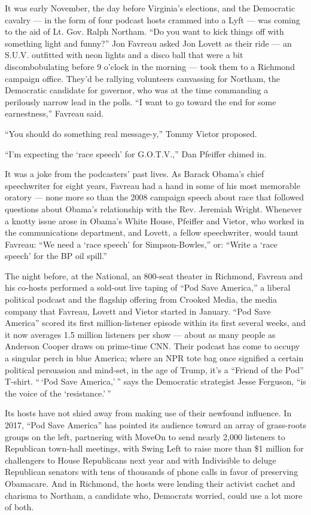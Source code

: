 It was early November, the day before Virginia's elections, and the
Democratic cavalry --- in the form of four podcast hosts crammed into a
Lyft --- was coming to the aid of Lt. Gov. Ralph Northam. ``Do you want
to kick things off with something light and funny?'' Jon Favreau asked
Jon Lovett as their ride --- an S.U.V. outfitted with neon lights and a
disco ball that were a bit discombobulating before 9 o'clock in the
morning --- took them to a Richmond campaign office. They'd be rallying
volunteers canvassing for Northam, the Democratic candidate for
governor, who was at the time commanding a perilously narrow lead in the
polls. ``I want to go toward the end for some earnestness,'' Favreau
said.

``You should do something real message-y,'' Tommy Vietor proposed.

``I'm expecting the `race speech' for G.O.T.V.,'' Dan Pfeiffer chimed
in.

It was a joke from the podcasters' past lives. As Barack Obama's chief
speechwriter for eight years, Favreau had a hand in some of his most
memorable oratory --- none more so than the 2008 campaign speech about
race that followed questions about Obama's relationship with the Rev.
Jeremiah Wright. Whenever a knotty issue arose in Obama's White House,
Pfeiffer and Vietor, who worked in the communications department, and
Lovett, a fellow speechwriter, would taunt Favreau: ``We need a `race
speech' for Simpson-Bowles,'' or: ``Write a `race speech' for the BP oil
spill.''

The night before, at the National, an 800-seat theater in Richmond,
Favreau and his co-hosts performed a sold-out live taping of ``Pod Save
America,'' a liberal political podcast and the flagship offering from
Crooked Media, the media company that Favreau, Lovett and Vietor started
in January. ``Pod Save America'' scored its first million-listener
episode within its first several weeks, and it now averages 1.5 million
listeners per show --- about as many people as Anderson Cooper draws on
prime-time CNN. Their podcast has come to occupy a singular perch in
blue America; where an NPR tote bag once signified a certain political
persuasion and mind-set, in the age of Trump, it's a ``Friend of the
Pod'' T-shirt. `` `Pod Save America,' '' says the Democratic strategist
Jesse Ferguson, ``is the voice of the `resistance.' ''

Its hosts have not shied away from making use of their newfound
influence. In 2017, ``Pod Save America'' has pointed its audience toward
an array of grass-roots groups on the left, partnering with MoveOn to
send nearly 2,000 listeners to Republican town-hall meetings, with Swing
Left to raise more than \$1 million for challengers to House Republicans
next year and with Indivisible to deluge Republican senators with tens
of thousands of phone calls in favor of preserving Obamacare. And in
Richmond, the hosts were lending their activist cachet and charisma to
Northam, a candidate who, Democrats worried, could use a lot more of
both.

